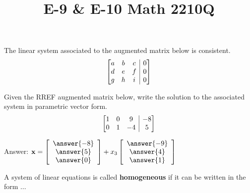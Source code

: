 \documentclass{ximera}
\makeatletter
\newenvironment{amatrix}[1]{%
	\left[\begin{array}{@{}*{#1}{c}|c@{}}
	}{%
\end{array}\right]
}
\newcommand{\bb}{{\bf b}}
\newcommand{\bx}{{\bf x}}
\makeatother
\begin{document}
  	\title{E-9 \& E-10 \hfill Math 2210Q} 

  	
  
 

  	 	\begin{question}
  
  The linear system associated to the augmented matrix below is consistent.\\
  $$\begin{amatrix}{3}
  a&b&c &0\\
  d&e&f&0\\
  g &h&i&0
  \end{amatrix}$$
  
  \begin{multipleChoice}
  	\end{multipleChoice}
  	
  		\end{question}
  		
  		\begin{question} Given the RREF augmented matrix below, write the solution to the associated system in parametric vector form.\\
  	$$\begin{amatrix}{3}
  	1&0&9&-8\\
  	0&1&-4&5
  	\end{amatrix}$$
  	
  	Answer: $\bx = \left[ \begin{array}{c} \answer{-8} \\ \answer{5} \\ \answer{0}  \end{array} \right] +x_3  \left[ \begin{array}{c} \answer{-9}\\ \answer{4}\\ \answer{1} \end{array} \right]$
  	
  		
  	\end{question}
  	
  	\begin{question} A system of linear equations is called {\bf homogeneous} if it can be written in the form $\dots$
  		
  		\begin{multipleChoice}
  			\choice[correct] {$A\bx= {\bf 0}$}
  			\choice{A\bx=\bb}
  			\end{multipleChoice}
  			
  			\end{question}
  	
\end{document}
